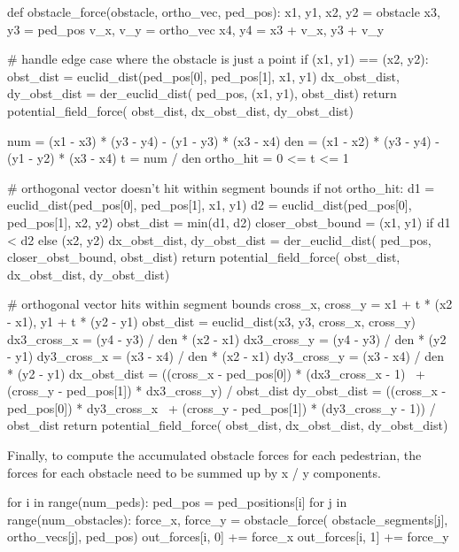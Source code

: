 \documentclass[fleqn]{article}
\begin{document}
\begin{python}
def obstacle_force(obstacle, ortho_vec, ped_pos):
    x1, y1, x2, y2 = obstacle
    x3, y3 = ped_pos
    v_x, v_y = ortho_vec
    x4, y4 = x3 + v_x, y3 + v_y

    # handle edge case where the obstacle is just a point
    if (x1, y1) == (x2, y2):
        obst_dist = euclid_dist(ped_pos[0], ped_pos[1], x1, y1)
        dx_obst_dist, dy_obst_dist = der_euclid_dist(
            ped_pos, (x1, y1), obst_dist)
        return potential_field_force(
            obst_dist, dx_obst_dist, dy_obst_dist)

    num = (x1 - x3) * (y3 - y4) - (y1 - y3) * (x3 - x4)
    den = (x1 - x2) * (y3 - y4) - (y1 - y2) * (x3 - x4)
    t = num / den
    ortho_hit = 0 <= t <= 1

    # orthogonal vector doesn't hit within segment bounds
    if not ortho_hit:
        d1 = euclid_dist(ped_pos[0], ped_pos[1], x1, y1)
        d2 = euclid_dist(ped_pos[0], ped_pos[1], x2, y2)
        obst_dist = min(d1, d2)
        closer_obst_bound = (x1, y1) if d1 < d2 else (x2, y2)
        dx_obst_dist, dy_obst_dist = der_euclid_dist(
            ped_pos, closer_obst_bound, obst_dist)
        return potential_field_force(
            obst_dist, dx_obst_dist, dy_obst_dist)

    # orthogonal vector hits within segment bounds
    cross_x, cross_y = x1 + t * (x2 - x1), y1 + t * (y2 - y1)
    obst_dist = euclid_dist(x3, y3, cross_x, cross_y)
    dx3_cross_x = (y4 - y3) / den * (x2 - x1)
    dx3_cross_y = (y4 - y3) / den * (y2 - y1)
    dy3_cross_x = (x3 - x4) / den * (x2 - x1)
    dy3_cross_y = (x3 - x4) / den * (y2 - y1)
    dx_obst_dist = ((cross_x - ped_pos[0]) * (dx3_cross_x - 1) \
        + (cross_y - ped_pos[1]) * dx3_cross_y) / obst_dist
    dy_obst_dist = ((cross_x - ped_pos[0]) * dy3_cross_x \
        + (cross_y - ped_pos[1]) * (dy3_cross_y - 1)) / obst_dist
    return potential_field_force(
        obst_dist, dx_obst_dist, dy_obst_dist)
\end{python}

Finally, to compute the accumulated obstacle forces for each pedestrian,
the forces for each obstacle need to be summed up by x / y components.

\begin{python}
for i in range(num_peds):
    ped_pos = ped_positions[i]
    for j in range(num_obstacles):
        force_x, force_y = obstacle_force(
            obstacle_segments[j], ortho_vecs[j], ped_pos)
        out_forces[i, 0] += force_x
        out_forces[i, 1] += force_y
\end{python}
\end{document}
